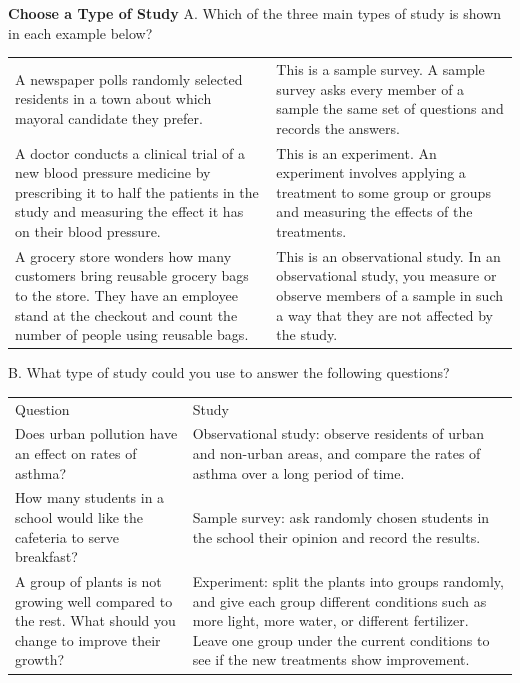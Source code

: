 \documentclass{article}
\newenvironment{example}[1]{}{}         %
\newcommand{\answer}[1]{}               %
\newcommand{\placeholder}[2]{}          %
\newcommand{\te}[1]{}                   %
\begin{document}
\begin{example}{1}
\textbf{Choose a Type of Study}
A. Which of the three main types of study is shown in each example below?
\begin{tabular}{ll}
A newspaper polls randomly selected residents in a town about which mayoral candidate they prefer. & This is a sample survey. A sample survey asks every member of a sample the same set of questions and records the answers. \\
A doctor conducts a clinical trial of a new blood pressure medicine by prescribing it to half the patients in the study and measuring the effect it has on their blood pressure. & This is an experiment. An experiment involves applying a treatment to some group or groups and measuring the effects of the treatments. \\
A grocery store wonders how many customers bring reusable grocery bags to the store. They have an employee stand at the checkout and count the number of people using reusable bags. & This is an observational study. In an observational study, you measure or observe members of a sample in such a way that they are not affected by the study. \\
\end{tabular}
\placeholder{photo}{Woman wearing a telephone headset in an office, illustrating a sample survey.}
\placeholder{photo}{Doctor measuring a seated patient's blood pressure, illustrating an experiment.}
\placeholder{photo}{Grocery checkout with green reusable bags, illustrating an observational study.}
\answer{A. sample survey; experiment; observational study.}
\te{LOOK FOR RELATIONSHIPS In which type of study might a person be unaware that he or she is a participant?}
B. What type of study could you use to answer the following questions?
\begin{tabular}{ll}
Question & Study \\
Does urban pollution have an effect on rates of asthma? & Observational study: observe residents of urban and non-urban areas, and compare the rates of asthma over a long period of time. \\
How many students in a school would like the cafeteria to serve breakfast? & Sample survey: ask randomly chosen students in the school their opinion and record the results. \\
A group of plants is not growing well compared to the rest. What should you change to improve their growth? & Experiment: split the plants into groups randomly, and give each group different conditions such as more light, more water, or different fertilizer. Leave one group under the current conditions to see if the new treatments show improvement. \\

\end{tabular}
\end{example}
\end{document}
